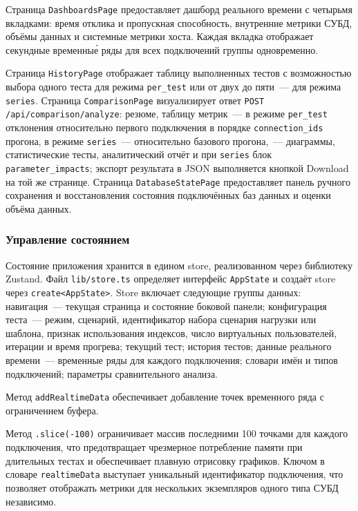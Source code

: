 Страница \texttt{DashboardsPage} предоставляет дашборд реального времени с четырьмя вкладками: время отклика и пропускная способность, внутренние метрики СУБД, объёмы данных и системные метрики хоста. Каждая вкладка отображает секундные временны\'е ряды для всех подключений группы одновременно.

Страница \texttt{HistoryPage} отображает таблицу выполненных тестов с возможностью выбора одного теста для режима \texttt{per\_test} или от двух до пяти~--- для режима \texttt{series}. Страница \texttt{ComparisonPage} визуализирует ответ \texttt{POST /api/comparison/analyze}: резюме, таблицу метрик~--- в режиме \texttt{per\_test} отклонения относительно первого подключения в порядке \texttt{connection\_ids} прогона, в режиме \texttt{series}~--- относительно базового прогона,~--- диаграммы, статистические тесты, аналитический отчёт и при \texttt{series} блок \texttt{parameter\_impacts}; экспорт результата в JSON выполняется кнопкой Download на той же странице. Страница \texttt{DatabaseStatePage} предоставляет панель ручного сохранения и восстановления состояния подключённых баз данных и оценки объёма данных.

\subsubsection{Управление состоянием}

Состояние приложения хранится в едином store, реализованном через библиотеку Zustand. Файл \texttt{lib/store.ts} определяет интерфейс \texttt{AppState} и создаёт store через \texttt{create<AppState>}. Store включает следующие группы данных: навигация~--- текущая страница и состояние боковой панели; конфигурация теста~--- режим, сценарий, идентификатор набора сценария нагрузки или шаблона, признак использования индексов, число виртуальных пользователей, итерации и время прогрева; текущий тест; история тестов; данные реального времени~--- временные ряды для каждого подключения; словари имён и типов подключений; параметры сравнительного анализа.

Метод \texttt{addRealtimeData} обеспечивает добавление точек временного ряда с ограничением буфера.

Метод \texttt{.slice(-100)} ограничивает массив последними 100 точками для каждого подключения, что предотвращает чрезмерное потребление памяти при длительных тестах и обеспечивает плавную отрисовку графиков. Ключом в словаре \texttt{realtimeData} выступает уникальный идентификатор подключения, что позволяет отображать метрики для нескольких экземпляров одного типа СУБД независимо.

